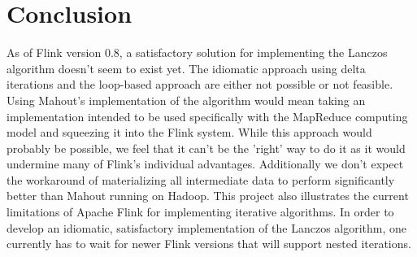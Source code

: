 \section{Conclusion}

As of Flink version 0.8, a satisfactory solution for implementing the Lanczos
algorithm doesn't seem to exist yet. The idiomatic approach using delta
iterations and the loop-based approach are either not possible or not feasible.
Using Mahout's implementation of the algorithm would mean taking an
implementation intended to be used specifically with the MapReduce computing
model and squeezing it into the Flink system. While this approach would
probably be possible, we feel that it can't be the 'right' way to do it as it
would undermine many of Flink's individual advantages. Additionally we don't
expect the workaround of materializing all intermediate data to perform
significantly better than Mahout running on Hadoop. This project also
illustrates the current limitations of Apache Flink for implementing iterative
algorithms. In order to develop an idiomatic, satisfactory implementation of
the Lanczos algorithm, one currently has to wait for newer Flink versions that
will support nested iterations.
